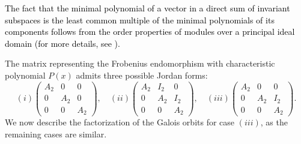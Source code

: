 \documentclass[11pt,a4paper]{article}
\theoremstyle{plain}
\theoremstyle{definition}
\theoremstyle{remark}
\newcommand{\verde}[1]{\textcolor{black}{#1}}
\begin{document}
\verde{The fact that the minimal polynomial of a vector in a direct sum of invariant subspaces is the least common multiple of the minimal polynomials of its components follows from the order properties of modules over a principal ideal domain (for more details, see \cite[Theorems 6.2 and  7.14]{roman2008}).}





The matrix representing the Frobenius endomorphism with characteristic polynomial $P(x)$ admits three possible Jordan forms:
$$(i) \begin{pmatrix}
A_2 & 0 & 0 \\
0   & A_2 & 0 \\
0   & 0   & A_2
\end{pmatrix}, \quad (ii)
\begin{pmatrix}
A_2 & I_2 & 0 \\
0   & A_2 & I_2 \\
0   & 0   & A_2
\end{pmatrix},\quad (iii)
\begin{pmatrix}
A_2 & 0 & 0 \\
0   & A_2 & I_2 \\
0   & 0   & A_2
\end{pmatrix}.$$
We now describe the factorization of the Galois orbits for case $(iii)$, as the remaining cases are similar.\\ 
\end{document}

